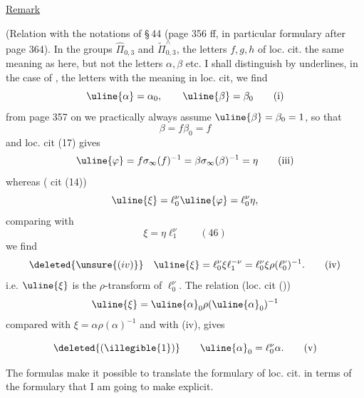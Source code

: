 \uline{Remark}

(Relation with the notations of \S\,44 (page 356 ff, in particular formulary after page 364). In the groups $\widehat{\Pi}_{0,3}$ and $\widetilde{\Pi}_{0,3}^{\wedge}$, the letters $f,g,h$ of loc. cit.  the same meaning as here, but not the letters $\alpha,\beta$ etc. I shall distinguish by underlines, in the case of  , the letters with the  meaning  in loc. cit, we find
\[
\uline{\alpha}=\alpha_0,\qquad\uline{\beta}=\beta_0
\tag{i}
\]
from page 357 on we practically always assume $\uline{\beta}=\beta_0=1$,  so that
\[
\boxed{\beta=f\beta_0=f}
\tag{ii}
\]
 and loc. cit (17) gives
\[
\uline{\varphi}=f\sigma_\infty(f)^{-1}=\beta\sigma_\infty(\beta)^{-1}=\eta
\tag{iii}
\]
whereas ( cit (14))
\[
\uline{\xi}=\ell_0^\nu\uline{\varphi}=\ell_0^\nu\eta,
\]
comparing with
\[
\xi=\eta\ell_1^\nu\qquad(46)
\]
we find
\[
\deleted{\unsure{(iv)}}\quad\uline{\xi}=\ell_0^\nu\xi\ell_1^{-\nu}
=\ell_0^\nu\xi\rho(\ell_0^\nu)^{-1}.
\tag{iv}
\]
i.e. $\uline{\xi}$ is the $\rho$-transform of $\ell_0^\nu$.
The relation (loc. cit ())
\[
\uline{\xi}=\uline{\alpha}_0\rho(\uline{\alpha}_0)^{-1}
\]
compared with $\xi=\alpha\rho(\alpha)^{-1}$ and with (iv), gives


\[
\deleted{(\illegible{1})}\qquad\uline{\alpha}_0=\ell_0^\nu\alpha.
\tag{v}
\]

The formulas   make it possible to translate the formulary of loc. cit. in terms of the formulary that I am going to make explicit.

